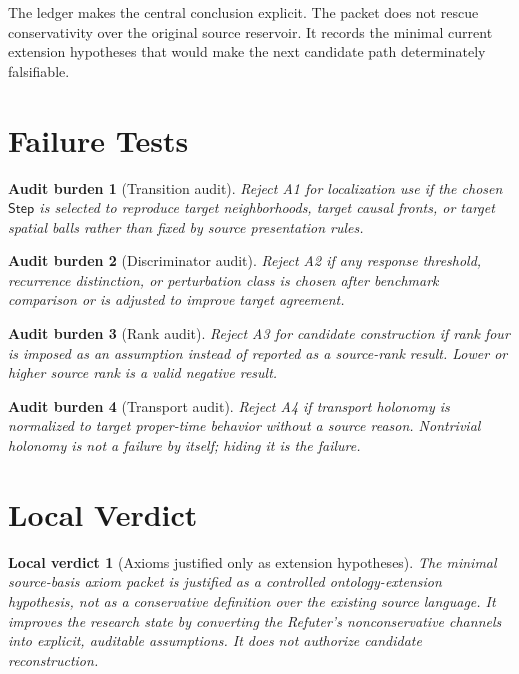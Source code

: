 \documentclass[11pt]{article}
\newcommand{\Step}{\mathsf{Step}}
\newtheorem{auditburden}{Audit burden}
\newtheorem{localverdict}{Local verdict}
\begin{document}
The ledger makes the central conclusion explicit. The packet does not rescue
conservativity over the original source reservoir. It records the minimal
current extension hypotheses that would make the next candidate path
determinately falsifiable.

\section{Failure Tests}

\begin{auditburden}[Transition audit]
Reject A1 for localization use if the chosen \(\Step\) is selected to
reproduce target neighborhoods, target causal fronts, or target spatial balls
rather than fixed by source presentation rules.
\end{auditburden}

\begin{auditburden}[Discriminator audit]
Reject A2 if any response threshold, recurrence distinction, or perturbation
class is chosen after benchmark comparison or is adjusted to improve target
agreement.
\end{auditburden}

\begin{auditburden}[Rank audit]
Reject A3 for candidate construction if rank four is imposed as an assumption
instead of reported as a source-rank result. Lower or higher source rank is a
valid negative result.
\end{auditburden}

\begin{auditburden}[Transport audit]
Reject A4 if transport holonomy is normalized to target proper-time behavior
without a source reason. Nontrivial holonomy is not a failure by itself; hiding
it is the failure.
\end{auditburden}

\section{Local Verdict}

\begin{localverdict}[Axioms justified only as extension hypotheses]
The minimal source-basis axiom packet is justified as a controlled
ontology-extension hypothesis, not as a conservative definition over the
existing source language. It improves the research state by converting the
Refuter's nonconservative channels into explicit, auditable assumptions. It
does not authorize candidate reconstruction.
\end{localverdict}
\end{document}
